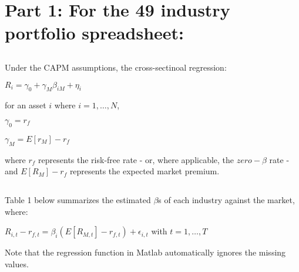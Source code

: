 \documentclass{report}
\begin{document}
\section{Part 1: For the 49 industry portfolio spreadsheet:}

\subsection{ }
Under the CAPM assumptions, the cross-sectinoal regression:
\begin{center}
	$R_i = \gamma_0 + \gamma_M \beta_{iM} + \eta_i$
\end{center}
for an asset $i$ where $i = 1, \dots, N$, 
\begin{center}
	$\gamma_0 = r_f$

	$\gamma_M = E[r_M] - r_f$
\end{center}
where $r_f$ represents the risk-free rate - or, where applicable, the $zero-\beta$ rate - and $E[R_M] - r_f$ represents the expected market premium.

\subsection{ }
Table 1 below summarizes the estimated $\beta$s of each industry against the market, where:
\begin{center}
	$R_{i, t} - r_{f, t} = \beta_i (E[R_{M, t}] - r_{f, t}) + \epsilon_{i, t}$ with $t = 1, \dots, T$
\end{center}
Note that the regression function in Matlab automatically ignores the missing values.
\end{document}
